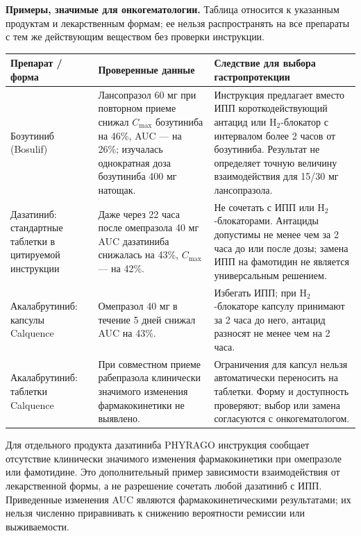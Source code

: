 \documentclass[11pt,a4paper,notitlepage]{report}
\newcommand{\src}[1]{\unskip\space\cite{#1}}
\begin{document}
\textbf{Примеры, значимые для онкогематологии.} Таблица относится к указанным продуктам и лекарственным формам; ее нельзя распространять на все препараты с тем же действующим веществом без проверки инструкции.
\begin{longtable}{P{0.22\textwidth}P{0.34\textwidth}P{0.35\textwidth}}
\toprule
Препарат / форма & Проверенные данные & Следствие для выбора гастропротекции \\
\midrule
\endhead
Бозутиниб (Bosulif) & Лансопразол 60 мг при повторном приеме снижал $C_{\max}$ бозутиниба на 46\%, AUC --- на 26\%; изучалась однократная доза бозутиниба 400 мг натощак. & Инструкция предлагает вместо ИПП короткодействующий антацид или H$_2$-блокатор с интервалом более 2 часов от бозутиниба. Результат не определяет точную величину взаимодействия для 15/30 мг лансопразола.\src{oncobosulif2026} \\
Дазатиниб: стандартные таблетки в цитируемой инструкции & Даже через 22 часа после омепразола 40 мг AUC дазатиниба снижалась на 43\%, $C_{\max}$ --- на 42\%. & Не сочетать с ИПП или H$_2$-блокаторами. Антациды допустимы не менее чем за 2 часа до или после дозы; замена ИПП на фамотидин не является универсальным решением.\src{oncodasatinib2026} \\
Акалабрутиниб: капсулы Calquence & Омепразол 40 мг в течение 5 дней снижал AUC на 43\%. & Избегать ИПП; при H$_2$-блокаторе капсулу принимают за 2 часа до него, антацид разносят не менее чем на 2 часа.\src{oncocalcaps2026} \\
Акалабрутиниб: таблетки Calquence & При совместном приеме рабепразола клинически значимого изменения фармакокинетики не выявлено. & Ограничения для капсул нельзя автоматически переносить на таблетки. Форму и доступность проверяют; выбор или замена согласуются с онкогематологом.\src{oncocaltablet2026} \\
\bottomrule
\end{longtable}
Для отдельного продукта дазатиниба PHYRAGO инструкция сообщает отсутствие клинически значимого изменения фармакокинетики при омепразоле или фамотидине. Это дополнительный пример зависимости взаимодействия от лекарственной формы, а не разрешение сочетать любой дазатиниб с ИПП. Приведенные изменения AUC являются фармакокинетическими результатами; их нельзя численно приравнивать к снижению вероятности ремиссии или выживаемости.\src{oncophyrago2024}
\end{document}
